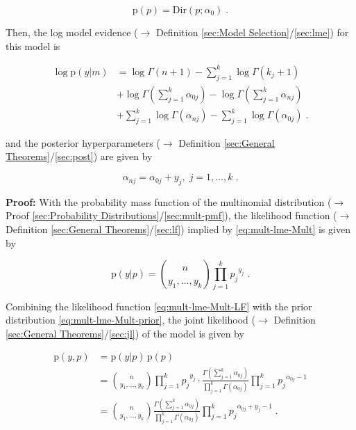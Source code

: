 \documentclass[a4paper,12pt,twoside]{book}
\begin{document}
\begin{equation} \label{eq:mult-lme-Mult-prior}
\mathrm{p}(p) = \mathrm{Dir}(p; \alpha_0) \; .
\end{equation}

Then, the log model evidence ($\rightarrow$ Definition \ref{sec:Model Selection}/\ref{sec:lme}) for this model is

\begin{equation} \label{eq:mult-lme-Mult-LME}
\begin{split}
\log \mathrm{p}(y|m) &= \log \Gamma(n+1) - \sum_{j=1}^{k} \log \Gamma(k_j+1) \\
&+ \log \Gamma \left( \sum_{j=1}^{k} \alpha_{0j} \right) - \log \Gamma \left( \sum_{j=1}^{k} \alpha_{nj} \right) \\
&+ \sum_{j=1}^k \log \Gamma(\alpha_{nj}) - \sum_{j=1}^k \log \Gamma(\alpha_{0j}) \; .
\end{split}
\end{equation}

and the posterior hyperparameters ($\rightarrow$ Definition \ref{sec:General Theorems}/\ref{sec:post}) are given by

\begin{equation} \label{eq:mult-lme-Mult-post-par}
\alpha_{nj} = \alpha_{0j} + y_j, \; j = 1,\ldots,k \; .
\end{equation}


\vspace{1em}
\textbf{Proof:} With the probability mass function of the multinomial distribution ($\rightarrow$ Proof \ref{sec:Probability Distributions}/\ref{sec:mult-pmf}), the likelihood function ($\rightarrow$ Definition \ref{sec:General Theorems}/\ref{sec:lf}) implied by \eqref{eq:mult-lme-Mult} is given by

\begin{equation} \label{eq:mult-lme-Mult-LF}
\mathrm{p}(y|p) = {n \choose {y_1, \ldots, y_k}} \prod_{j=1}^{k} {p_j}^{y_j} \; .
\end{equation}

Combining the likelihood function \eqref{eq:mult-lme-Mult-LF} with the prior distribution \eqref{eq:mult-lme-Mult-prior}, the joint likelihood ($\rightarrow$ Definition \ref{sec:General Theorems}/\ref{sec:jl}) of the model is given by

\begin{equation} \label{eq:mult-lme-Mult-JL}
\begin{split}
\mathrm{p}(y,p) &= \mathrm{p}(y|p) \, \mathrm{p}(p) \\
&= {n \choose {y_1, \ldots, y_k}} \prod_{j=1}^{k} {p_j}^{y_j} \cdot \frac{\Gamma \left( \sum_{j=1}^{k} \alpha_{0j} \right)}{\prod_{j=1}^k \Gamma(\alpha_{0j})} \prod_{j=1}^{k} {p_j}^{\alpha_{0j}-1} \\
&= {n \choose {y_1, \ldots, y_k}} \frac{\Gamma \left( \sum_{j=1}^{k} \alpha_{0j} \right)}{\prod_{j=1}^k \Gamma(\alpha_{0j})} \prod_{j=1}^{k} {p_j}^{\alpha_{0j}+y_j-1} \; .
\end{split}
\end{equation}
\end{document}
